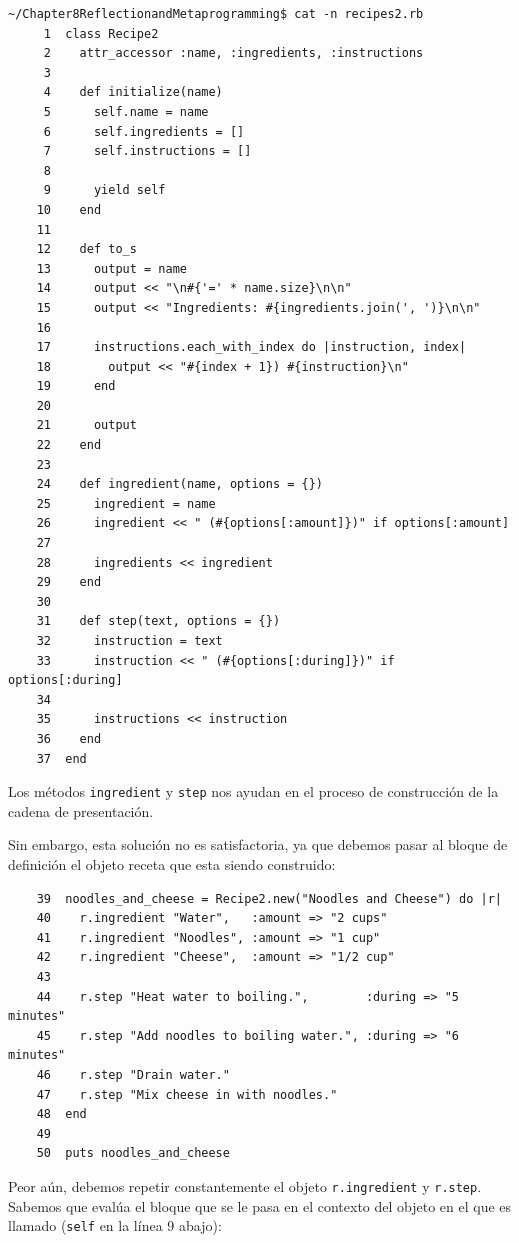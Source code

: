 \begin{verbatim}
~/Chapter8ReflectionandMetaprogramming$ cat -n recipes2.rb 
     1  class Recipe2
     2    attr_accessor :name, :ingredients, :instructions
     3  
     4    def initialize(name)
     5      self.name = name
     6      self.ingredients = []
     7      self.instructions = []
     8  
     9      yield self
    10    end
    11  
    12    def to_s
    13      output = name
    14      output << "\n#{'=' * name.size}\n\n"
    15      output << "Ingredients: #{ingredients.join(', ')}\n\n"
    16  
    17      instructions.each_with_index do |instruction, index|
    18        output << "#{index + 1}) #{instruction}\n"
    19      end
    20  
    21      output
    22    end
    23  
    24    def ingredient(name, options = {})
    25      ingredient = name
    26      ingredient << " (#{options[:amount]})" if options[:amount]
    27  
    28      ingredients << ingredient
    29    end
    30  
    31    def step(text, options = {})
    32      instruction = text
    33      instruction << " (#{options[:during]})" if options[:during]
    34  
    35      instructions << instruction
    36    end
    37  end
\end{verbatim}
Los métodos \verb|ingredient| y \verb|step| nos ayudan en el proceso de construcción de la cadena
de presentación.

Sin embargo, esta solución no es satisfactoria, ya que debemos pasar 
al bloque de definición el objeto receta que esta siendo construido:
\begin{verbatim}
    39  noodles_and_cheese = Recipe2.new("Noodles and Cheese") do |r|
    40    r.ingredient "Water",   :amount => "2 cups"
    41    r.ingredient "Noodles", :amount => "1 cup"
    42    r.ingredient "Cheese",  :amount => "1/2 cup"
    43  
    44    r.step "Heat water to boiling.",        :during => "5 minutes"
    45    r.step "Add noodles to boiling water.", :during => "6 minutes"
    46    r.step "Drain water."
    47    r.step "Mix cheese in with noodles."
    48  end
    49  
    50  puts noodles_and_cheese
\end{verbatim}
Peor aún, debemos repetir constantemente el objeto \verb|r.ingredient|
y \verb|r.step|.
Sabemos que  evalúa el bloque que se le pasa en el contexto del objeto
en el que es llamado (\verb|self| en la línea 9 abajo):


